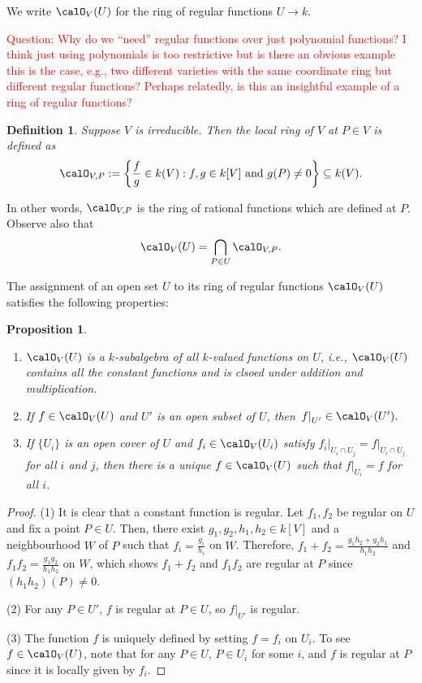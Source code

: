 \documentclass[12pt]{amsart}
\newcommand{\question}[1]{\noindent  \textcolor{red}{Question: #1}}
\theoremstyle{plain}
\newtheorem{definition}[theorem]{Definition}
\newtheorem{proposition}[theorem]{Proposition}
\begin{document}
We write $\calO_V(U)$ for the ring of regular functions $U \to k$.

\question{Why do we ``need'' regular functions over just polynomial functions? I think just using polynomials is too restrictive but is there an obvious example this is the case, e.g., two different varieties with the same coordinate ring but different regular functions? Perhaps relatedly, is this an insightful example of a ring of regular functions?}

\begin{definition}
Suppose $V$ is irreducible.
Then the local ring of $V$ at $P \in V$ is defined as
$$\calO_{V,P} :=\left\{\frac{f}{g} \in k(V) : f,g\in k[V] \mbox{ and } g(P) \ne 0\right\} \subseteq k(V).$$
\end{definition}

In other words, $\calO_{V,P}$ is the ring of rational functions which are defined at $P$.
Observe also that
$$\calO_V(U) = \bigcap_{P\in U} \calO_{V, P}.$$

The assignment of an open set $U$ to its ring of regular functions $\calO_V(U)$ satisfies the following properties:

\begin{proposition}\label{sheafprop}
\begin{enumerate}
\item
$\calO_V(U)$ is a $k$-subalgebra of all $k$-valued functions on $U$, i.e., $\calO_V(U)$ contains all the constant functions and is clsoed under addition and multiplication.

\item
If $f \in \calO_V(U)$ and $U'$ is an open subset of $U$, then $\left. f \right|_{U'} \in \calO_V(U').$

\item
If $\{U_i\}$ is an open cover of $U$ and $f_i \in \calO_V(U_i)$ satisfy $\left. f_i \right|_{U_i \cap U_j} = \left. f \right|_{U_i \cap U_j}$ for all $i$ and $j$, then there is a unique $f \in \calO_V(U)$ such that $\left. f \right|_{U_i} = f$ for all $i$.
\end{enumerate}
\end{proposition}
\begin{proof}
(1) It is clear that a constant function is regular.
Let $f_1, f_2$ be regular on $U$ and fix a point $P \in U$.
Then, there exist $g_1, g_2, h_1, h_2 \in k[V]$ and a neighbourhood $W$ of $P$ such that $f_i = \frac{g_i}{h_i}$ on $W$.
Therefore, $f_1 + f_2 = \frac{g_1 h_2 + g_2 h_1}{h_1 h_2}$ and $f_1 f_2 = \frac{g_1 g_2}{h_1 h_2}$ on $W$, which shows $f_1+f_2$ and $f_1 f_2$ are regular at $P$ since $(h_1 h_2)(P) \ne 0$.

(2) For any $P \in U'$, $f$ is regular at $P \in U$, so $\left. f \right|_{U'}$ is regular.

(3) The function $f$ is uniquely defined by setting $f = f_i$ on $U_i$.
To see $f \in \calO_V(U)$, note that for any $P \in U$, $P\in U_i$ for some $i$, and $f$ is regular at $P$ since it is locally given by $f_i$.
\end{proof}
\end{document}
